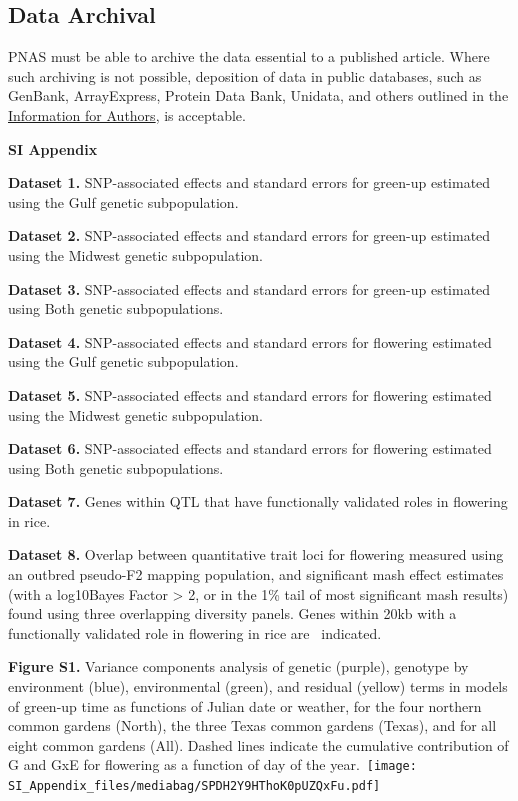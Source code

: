 \documentclass[
  letterpaper,
  DIV=11,
  numbers=noendperiod]{scrartcl}
\begin{document}
\subsection*{Data Archival}\label{data-archival}

PNAS must be able to archive the data essential to a published article.
Where such archiving is not possible, deposition of data in public
databases, such as GenBank, ArrayExpress, Protein Data Bank, Unidata,
and others outlined in the
\href{https://www.pnas.org/author-center/editorial-and-journal-policies\#materials-and-data-availability}{Information
for Authors}, is acceptable.

\textbf{SI Appendix}

\hfill\break

\textbf{Dataset 1.} SNP-associated effects and standard errors for
green-up estimated using the Gulf genetic subpopulation.

\textbf{Dataset 2.} SNP-associated effects and standard errors for
green-up estimated using the Midwest genetic subpopulation.

\textbf{Dataset 3.} SNP-associated effects and standard errors for
green-up estimated using Both genetic subpopulations.

\textbf{Dataset 4.} SNP-associated effects and standard errors for
flowering estimated using the Gulf genetic subpopulation.

\textbf{Dataset 5.} SNP-associated effects and standard errors for
flowering estimated using the Midwest genetic subpopulation.

\textbf{Dataset 6.} SNP-associated effects and standard errors for
flowering estimated using Both genetic subpopulations.

\textbf{Dataset 7.} Genes within QTL that have functionally validated
roles in flowering in rice.

\textbf{Dataset 8.} Overlap between quantitative trait loci for
flowering measured using an outbred pseudo-F2 mapping population, and
significant mash effect estimates (with a log10Bayes Factor
\textgreater{} 2, or in the 1\% tail of most significant mash results)
found using three overlapping diversity panels. Genes within 20kb with a
functionally validated role in flowering in rice are~ indicated.~

\hfill\break

\textbf{Figure S1.} Variance components analysis of genetic (purple),
genotype by environment (blue), environmental (green), and residual
(yellow) terms in models of green-up time as functions of Julian date or
weather, for the four northern common gardens (North), the three Texas
common gardens (Texas), and for all eight common gardens (All). Dashed
lines indicate the cumulative contribution of G and GxE for flowering as
a function of day of the
year.~\texttt{[image: SI\_Appendix\_files/mediabag/SPDH2Y9HThoK0pUZQxFu.pdf]}
\end{document}
